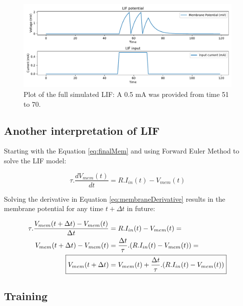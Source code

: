 		
		
		\begin{figure}[H]
			\centering
			\includegraphics[width=\linewidth]{images/membranePotentialFull}
			\caption{Plot of the full simulated LIF: A 0.5 mA was provided from time 51 to 70.}
			\label{fig:membranepotentialfull}
		\end{figure}
		
		\subsection{Another interpretation of LIF}
		
			\par Starting with the Equation \ref{eq:finalMem} and using Forward Euler Method to solve the LIF model:
			
			\begin{equation}
				\tau.\dfrac{dV_{mem}(t)}{dt} = R.I_{in}(t) - V_{mem}(t)
			\end{equation}
			
			\par Solving the derivative in Equation \ref{eq:membraneDerivative} results in the membrane potential for any time $t+\Delta t$ in future:
			
			\begin{equation}
				\label{eq:membraneDerivative}
				\begin{aligned}
					\tau.\dfrac{V_{mem}(t+\Delta t) - V_{mem}(t)}{\Delta t} &= R.I_{in}(t) - V_{mem}(t) = \\
					V_{mem}(t+\Delta t) - V_{mem}(t) &= \frac{\Delta t}{\tau} . (R.I_{in}(t) - V_{mem}(t)) = \\
					\Aboxed{V_{mem}(t+\Delta t) &= V_{mem}(t) + \frac{\Delta t}{\tau} . (R.I_{in}(t) - V_{mem}(t))}
				\end{aligned}
			\end{equation}
	
		\subsection{Training}
		
